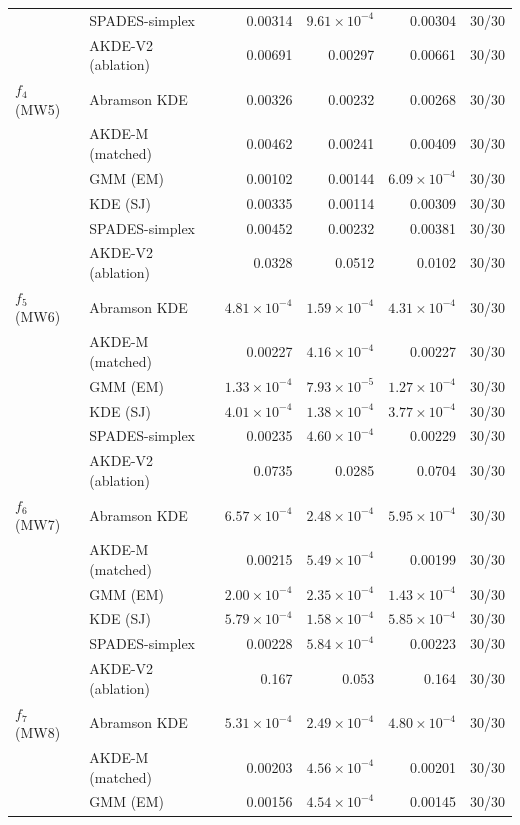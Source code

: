 \begin{tabular}{llrrrr}
 & SPADES-simplex & 0.00314 & $9.61\times10^{-4}$ & 0.00304 & 30/30 \\
 & AKDE-V2 (ablation) & 0.00691 & 0.00297 & 0.00661 & 30/30 \\
$f_{4}$ (MW5) & Abramson KDE & 0.00326 & 0.00232 & 0.00268 & 30/30 \\
 & AKDE-M (matched) & 0.00462 & 0.00241 & 0.00409 & 30/30 \\
 & GMM (EM) & 0.00102 & 0.00144 & $6.09\times10^{-4}$ & 30/30 \\
 & KDE (SJ) & 0.00335 & 0.00114 & 0.00309 & 30/30 \\
 & SPADES-simplex & 0.00452 & 0.00232 & 0.00381 & 30/30 \\
 & AKDE-V2 (ablation) & 0.0328 & 0.0512 & 0.0102 & 30/30 \\
$f_{5}$ (MW6) & Abramson KDE & $4.81\times10^{-4}$ & $1.59\times10^{-4}$ & $4.31\times10^{-4}$ & 30/30 \\
 & AKDE-M (matched) & 0.00227 & $4.16\times10^{-4}$ & 0.00227 & 30/30 \\
 & GMM (EM) & $1.33\times10^{-4}$ & $7.93\times10^{-5}$ & $1.27\times10^{-4}$ & 30/30 \\
 & KDE (SJ) & $4.01\times10^{-4}$ & $1.38\times10^{-4}$ & $3.77\times10^{-4}$ & 30/30 \\
 & SPADES-simplex & 0.00235 & $4.60\times10^{-4}$ & 0.00229 & 30/30 \\
 & AKDE-V2 (ablation) & 0.0735 & 0.0285 & 0.0704 & 30/30 \\
$f_{6}$ (MW7) & Abramson KDE & $6.57\times10^{-4}$ & $2.48\times10^{-4}$ & $5.95\times10^{-4}$ & 30/30 \\
 & AKDE-M (matched) & 0.00215 & $5.49\times10^{-4}$ & 0.00199 & 30/30 \\
 & GMM (EM) & $2.00\times10^{-4}$ & $2.35\times10^{-4}$ & $1.43\times10^{-4}$ & 30/30 \\
 & KDE (SJ) & $5.79\times10^{-4}$ & $1.58\times10^{-4}$ & $5.85\times10^{-4}$ & 30/30 \\
 & SPADES-simplex & 0.00228 & $5.84\times10^{-4}$ & 0.00223 & 30/30 \\
 & AKDE-V2 (ablation) & 0.167 & 0.053 & 0.164 & 30/30 \\
$f_{7}$ (MW8) & Abramson KDE & $5.31\times10^{-4}$ & $2.49\times10^{-4}$ & $4.80\times10^{-4}$ & 30/30 \\
 & AKDE-M (matched) & 0.00203 & $4.56\times10^{-4}$ & 0.00201 & 30/30 \\
 & GMM (EM) & 0.00156 & $4.54\times10^{-4}$ & 0.00145 & 30/30 \\

\end{tabular}
